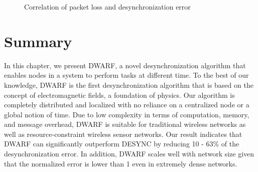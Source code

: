 \begin{figure}[!t]
\centerline{
	\hfil
	\hfil
}
\caption{Correlation of packet loss and desynchronization error}
\label{fig:error-loss}
\lofcont
\end{figure}
\section{Summary}
In this chapter, we present DWARF, a novel desynchronization algorithm that enables nodes in a system to perform tasks at different time. To the best of our knowledge, DWARF is the first desynchronization algorithm that is based on the concept of electromagnetic fields, a foundation of physics.
Our algorithm is completely distributed and localized with no reliance on a centralized node or a global notion of time. Due to low complexity in terms of computation, memory, and message overhead, DWARF is suitable for traditional wireless networks as well as resource-constraint wireless sensor networks. Our result indicates that DWARF can significantly outperform DESYNC by reducing 10 - 63\% of the desynchronization error. In addition, DWARF scales well with network size given that the normalized error is lower than 1 even in extremely dense networks.

